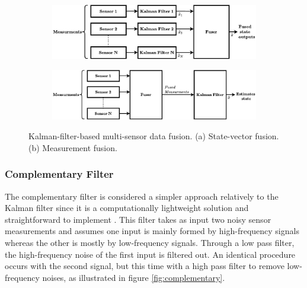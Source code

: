 \begin{figure}
    \centering
    \begin{subfigure}[b]{0.45\textwidth}
        \includegraphics[width=1\linewidth]{figures/kalman1.pdf}
        \caption{}
        \label{fig:state_kalman}
    \end{subfigure}
    \begin{subfigure}[b]{0.45\textwidth}
        \includegraphics[width=1\linewidth]{figures/kalman2.pdf}
        \caption{}
        \label{fig:mesearurment_kalman}
    \end{subfigure}

    \caption{ Kalman-filter-based multi-sensor data fusion.
        (a) State-vector fusion. (b) Measurement fusion. \cite{mosallaei2007process} }
\end{figure}

\subsubsection{Complementary Filter}

The complementary filter is considered a simpler approach relatively to the Kalman filter since it is a computationally lightweight solution and straightforward to implement \cite{higgins1975comparison}. This filter takes as input two noisy sensor measurements and assumes one input is mainly formed by high-frequency signals whereas the other is mostly by low-frequency signals. Through a low pass filter, the high-frequency noise of the first input is filtered out. An identical procedure occurs with the second signal, but this time with a high pass filter to remove low-frequency noises, as illustrated in figure \ref{fig:complementary}.

